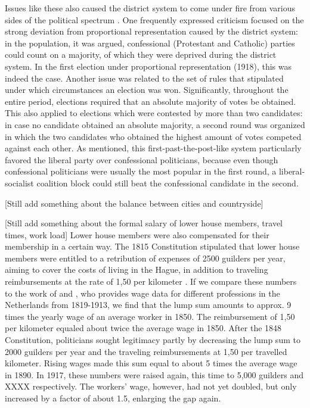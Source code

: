 \documentclass[12pt]{article}
\begin{document}
    Issues like these also caused the district system to come under fire from various sides of the political spectrum \citep{van2018tussen}. One frequently expressed criticism focused on the strong deviation from proportional representation caused by the district system: in the population, it was argued, confessional (Protestant and Catholic) parties could count on a majority, of which they were deprived during the district system. In the first election under proportional representation (1918), this was indeed the case. Another issue was related to the set of rules that stipulated under which circumstances an election was won. Significantly, throughout the entire period, elections required that an absolute majority of votes be obtained. This also applied to elections which were contested by more than two candidates: in case no candidate obtained an absolute majority, a second round was organized in which the two candidates who obtained the highest amount of votes competed against each other. As mentioned, this first-past-the-post-like system particularly favored the liberal party over confessional politicians, because even though confessional politicians were usually the most popular in the first round, a liberal-socialist coalition block could still beat the confessional candidate in the second. 

    [Still add something about the balance between cities and countryside]
    
    [Still add something about the formal salary of lower house members, travel times, work load]
    Lower house members were also compensated for their membership in a certain way. The 1815 Constitution stipulated that lower house members were entitled to a retribution of expenses of 2500 guilders per year, aiming to cover the costs of living in the Hague, in addition to traveling reimbursements at the rate of 1,50 per kilometer \citep{elzinga1985financiele}. If we compare these numbers to the work of \cite{van1983lonen} and \cite{van2018trials}, who provides wage data for different professions in the Netherlands from 1819-1913, we find that the lump sum amounts to approx. 9 times the yearly wage of an average worker in 1850. The reimbursement of 1,50 per kilometer equaled about twice the average wage in 1850. After the 1848 Constitution, politicians sought legitimacy partly by decreasing the lump sum to 2000 guilders per year and the traveling reimbursements at 1,50 per travelled kilometer. Rising wages made this sum equal to about 5 times the average wage in 1890. In 1917, these numbers were raised again, this time to 5,000 guilders and XXXX respectively. The workers' wage, however, had not yet doubled, but only increased by a factor of about 1.5, enlarging the gap again.
    
\end{document}
